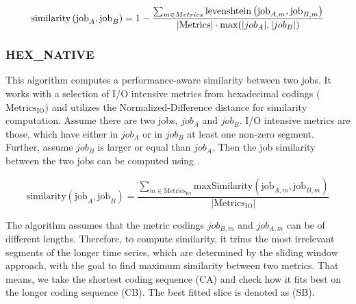 \documentclass{jhps}
\begin{document}
\begin{equation}
	\text{similarity}\left(\text{job}_{A},\text{job}_{B} \right) = 1 - \frac{ \sum_{m \in Metrics}^{} \text{levenshtein} \left(\text{job}_{A,m},\text{\text{job}}_{B,m} \right) }{|\text{Metrics}| \cdot \max(|job_A|, |job_{B}|)}
\end{equation}

\subsubsection{HEX\_NATIVE}
This algorithm computes a performance-aware similarity between two jobs.
It works with a selection of I/O intensive metrics from hexadecimal codings ($\text{Metrics}_{\text{IO}}$) and utilizes the Normalized-Difference distance for similarity computation.
Assume there are two jobs, $job_A$ and $job_B$.
I/O intensive metrics are those, which have either in $job_A$ or in $job_B$ at least one non-zero segment.
Further, assume $job_B$ is larger or equal than $job_A$.
Then the job similarity between the two jobs can be computed using .

\begin{equation}
  \text{similarity}\left(\text{job}_{A},\text{job}_{B} \right) = \frac{ \sum_{m \in \text{Metrics}_{\text{IO}}}^{} {\text{maxSimilarity} \left( \text{job}_{A,m}, \text{job}_{B,m} \right)}}{|\text{Metrics}_{\text{IO}}|}
  \label{eq:hexn}
\end{equation}

The algorithm assumes that the metric codings $job_{B,m}$ and $job_{A,m}$ can be of different lengths.
Therefore, to compute similarity, it trims the most irrelevant segments of the longer time series, which are determined by the sliding window approach, with the goal to find maximum similarity between two metrics.
That means, we take the shortest coding sequence (CA) and check how it fits best on the longer coding sequence (CB).
The best fitted slice is denoted as (SB).
\end{document}
